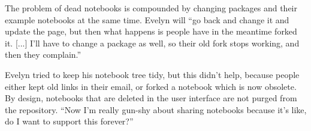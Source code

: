 The problem of dead notebooks is compounded by changing
packages and their example notebooks at the same time. Evelyn will ``go back and
change it and update the page, but then what happens is people have in the
meantime forked it. [...]  I'll have to change a package as well, so their
old fork stops working, and then they complain.''

Evelyn tried to keep his notebook tree tidy, but this didn't help, because
people either kept old links in their email, or forked a notebook which is now
obsolete. By design, notebooks that are deleted in the user interface are not
purged from the repository. ``Now I'm really gun-shy about sharing notebooks
because it's like, do I want to support this forever?''


